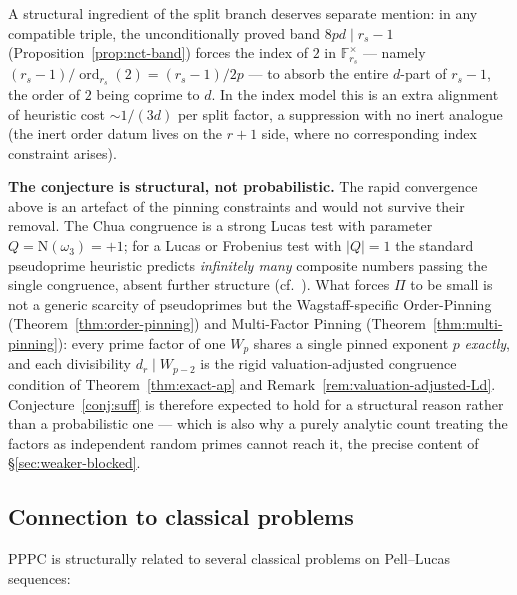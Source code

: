 \documentclass[11pt]{amsart}
\theoremstyle{plain}
\theoremstyle{definition}
\theoremstyle{remark}
\numberwithin{equation}{section}
\newcommand{\ord}{\operatorname{ord}}
\newcommand{\F}{\mathbb{F}}
\begin{document}
A structural ingredient of the split branch deserves separate mention: in any compatible triple, the unconditionally proved band $8 p d \mid r_s - 1$ (Proposition~\ref{prop:nct-band}) forces the index of $2$ in $\F_{r_s}^\times$ --- namely $(r_s - 1)/\ord_{r_s}(2) = (r_s - 1)/2p$ --- to absorb the entire $d$-part of $r_s - 1$, the order of $2$ being coprime to $d$. In the index model this is an extra alignment of heuristic cost $\sim 1/(3d)$ per split factor, a suppression with no inert analogue (the inert order datum lives on the $r + 1$ side, where no corresponding index constraint arises).

\textbf{The conjecture is structural, not probabilistic.} The rapid convergence above is an artefact of the pinning constraints and would not survive their removal. The Chua congruence is a strong Lucas test with parameter $Q = \mathrm{N}(\omega_3) = +1$; for a Lucas or Frobenius test with $|Q| = 1$ the standard pseudoprime heuristic predicts \emph{infinitely many} composite numbers passing the single congruence, absent further structure (cf.\ \cite{ref:Grantham}). What forces $\Pi$ to be small is not a generic scarcity of pseudoprimes but the Wagstaff-specific Order-Pinning (Theorem~\ref{thm:order-pinning}) and Multi-Factor Pinning (Theorem~\ref{thm:multi-pinning}): every prime factor of one $W_p$ shares a single pinned exponent $p$ \emph{exactly}, and each divisibility $d_r \mid W_{p-2}$ is the rigid valuation-adjusted congruence condition of Theorem~\ref{thm:exact-ap} and Remark~\ref{rem:valuation-adjusted-Ld}. Conjecture~\ref{conj:suff} is therefore expected to hold for a structural reason rather than a probabilistic one --- which is also why a purely analytic count treating the factors as independent random primes cannot reach it, the precise content of \S\ref{sec:weaker-blocked}.

\subsection{Connection to classical problems}

PPPC is structurally related to several classical problems on Pell--Lucas sequences:
\end{document}

